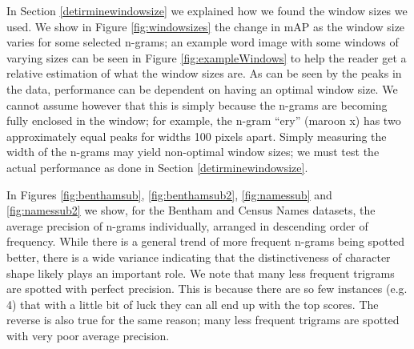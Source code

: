 \documentclass[ms,electronic,twosidetoc,letterpaper,chaptercenter,parttop,lof,lot]{byumsphd}
\begin{document}
In Section \ref{detirminewindowsize} we explained how we found the window sizes we used. We show in Figure \ref{fig:windowsizes} the change in mAP as the window size varies for some selected n-grams; an example word image with some windows of varying sizes can be seen in Figure \ref{fig:exampleWindows} to help the reader get a relative estimation of what the window sizes are. As can be seen by the peaks in the data, performance can be dependent on having an optimal window size. We cannot assume however that this is simply because the n-grams are becoming fully enclosed in the window; for example, the n-gram ``ery'' (maroon x) has two approximately equal peaks for widths 100 pixels apart. Simply measuring the width of the n-grams may yield non-optimal window sizes; we must test the actual performance as done in Section \ref{detirminewindowsize}.



In Figures \ref{fig:benthamsub}, \ref{fig:benthamsub2}, \ref{fig:namessub} and \ref{fig:namessub2} we show, for the Bentham and Census Names datasets, the average precision of n-grams individually, arranged in descending order of frequency. While there is a general trend of more frequent n-grams being spotted better, there is a wide variance indicating that the distinctiveness of character shape likely plays an important role. We note that many less frequent trigrams are spotted with perfect precision. This is because there are so few instances (e.g. 4) that with a little bit of luck they can all end up with the top scores. The reverse is also true for the same reason; many less frequent trigrams are spotted with very poor average precision.
\end{document}
